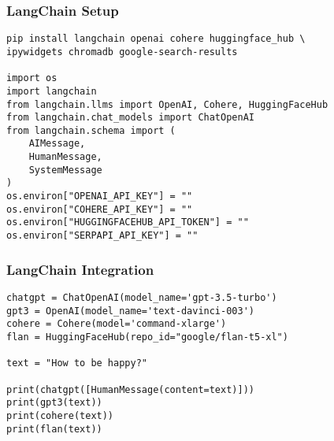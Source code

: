 \begin{frame}[fragile]\frametitle{LangChain Setup}

\begin{lstlisting}
pip install langchain openai cohere huggingface_hub \
ipywidgets chromadb google-search-results

import os
import langchain
from langchain.llms import OpenAI, Cohere, HuggingFaceHub
from langchain.chat_models import ChatOpenAI
from langchain.schema import (
    AIMessage,
    HumanMessage,
    SystemMessage
)
os.environ["OPENAI_API_KEY"] = ""
os.environ["COHERE_API_KEY"] = ""
os.environ["HUGGINGFACEHUB_API_TOKEN"] = ""
os.environ["SERPAPI_API_KEY"] = ""
\end{lstlisting}	  

\end{frame}

\begin{frame}[fragile]\frametitle{LangChain Integration}

\begin{lstlisting}
chatgpt = ChatOpenAI(model_name='gpt-3.5-turbo')
gpt3 = OpenAI(model_name='text-davinci-003')
cohere = Cohere(model='command-xlarge')
flan = HuggingFaceHub(repo_id="google/flan-t5-xl")

text = "How to be happy?"

print(chatgpt([HumanMessage(content=text)]))
print(gpt3(text))
print(cohere(text))
print(flan(text))
\end{lstlisting}	  

\end{frame}
